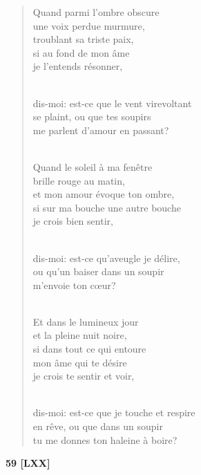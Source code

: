 \documentclass[a4paper,12pt]{book}
\begin{document}
\begin{verse}
Quand parmi l'ombre obscure \\
une voix perdue murmure, \\
troublant sa triste paix, \\
si au fond de mon âme \\
je l'entends résonner, \\ \

dis-moi: est-ce que le vent virevoltant \\
se plaint, ou que tes soupirs \\
me parlent d'amour en passant? \\ \

Quand le soleil à ma fenêtre \\
brille rouge au matin, \\
et mon amour évoque ton ombre, \\
si sur ma bouche une autre bouche \\
je crois bien sentir, \\ \

dis-moi: est-ce qu'aveugle je délire, \\
ou qu'un baiser dans un soupir \\
m'envoie ton c{\oe}ur? \\ \

Et dans le lumineux jour \\
et la pleine nuit noire, \\
si dans tout ce qui entoure \\
mon âme qui te désire \\
je crois te sentir et voir, \\ \

dis-moi: est-ce que je touche et respire \\
en rêve, ou que dans un soupir \\
tu me donnes ton haleine à boire? \\
\end{verse}

\bigskip

\begin{center} {\bf 59 [LXX]} \end{center}
\end{document}
